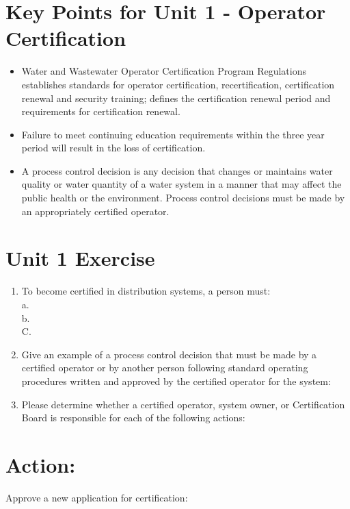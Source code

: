 \documentclass[10pt]{article}
\begin{document}
\section{Key Points for Unit 1 - Operator Certification}
\begin{itemize}
  \item Water and Wastewater Operator Certification Program Regulations establishes standards for operator certification, recertification, certification renewal and security training; defines the certification renewal period and requirements for certification renewal.

  \item Failure to meet continuing education requirements within the three year period will result in the loss of certification.

  \item A process control decision is any decision that changes or maintains water quality or water quantity of a water system in a manner that may affect the public health or the environment. Process control decisions must be made by an appropriately certified operator.

\end{itemize}
\section{Unit 1 Exercise}
\begin{enumerate}
  \item To become certified in distribution systems, a person must:\\
a.\\
b.\\
C.

  \item Give an example of a process control decision that must be made by a certified operator or by another person following standard operating procedures written and approved by the certified operator for the system:

  \item Please determine whether a certified operator, system owner, or Certification Board is responsible for each of the following actions:

\end{enumerate}
\section{Action:}
Approve a new application for certification:
\end{document}
